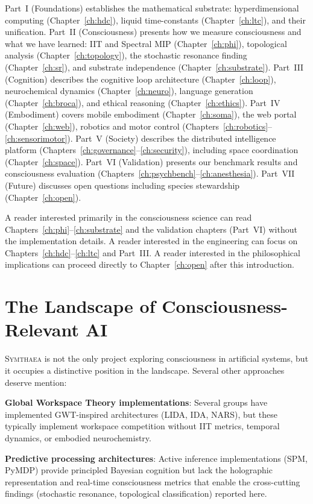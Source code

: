 \documentclass[12pt]{book}
\newcommand{\symthaea}{\textsc{Symthaea}}
\begin{document}
Part~I (Foundations) establishes the mathematical substrate: hyperdimensional computing (Chapter~\ref{ch:hdc}), liquid time-constants (Chapter~\ref{ch:ltc}), and their unification. Part~II (Consciousness) presents how we measure consciousness and what we have learned: IIT and Spectral MIP (Chapter~\ref{ch:phi}), topological analysis (Chapter~\ref{ch:topology}), the stochastic resonance finding (Chapter~\ref{ch:sr}), and substrate independence (Chapter~\ref{ch:substrate}). Part~III (Cognition) describes the cognitive loop architecture (Chapter~\ref{ch:loop}), neurochemical dynamics (Chapter~\ref{ch:neuro}), language generation (Chapter~\ref{ch:broca}), and ethical reasoning (Chapter~\ref{ch:ethics}). Part~IV (Embodiment) covers mobile embodiment (Chapter~\ref{ch:soma}), the web portal (Chapter~\ref{ch:web}), robotics and motor control (Chapters~\ref{ch:robotics}--\ref{ch:sensorimotor}). Part~V (Society) describes the distributed intelligence platform (Chapters~\ref{ch:governance}--\ref{ch:security}), including space coordination (Chapter~\ref{ch:space}). Part~VI (Validation) presents our benchmark results and consciousness evaluation (Chapters~\ref{ch:psychbench}--\ref{ch:anesthesia}). Part~VII (Future) discusses open questions including species stewardship (Chapter~\ref{ch:open}).

A reader interested primarily in the consciousness science can read Chapters~\ref{ch:phi}--\ref{ch:substrate} and the validation chapters (Part~VI) without the implementation details. A reader interested in the engineering can focus on Chapters~\ref{ch:hdc}--\ref{ch:ltc} and Part~III. A reader interested in the philosophical implications can proceed directly to Chapter~\ref{ch:open} after this introduction.

\section{The Landscape of Consciousness-Relevant AI}

\symthaea{} is not the only project exploring consciousness in artificial systems, but it occupies a distinctive position in the landscape. Several other approaches deserve mention:

\textbf{Global Workspace Theory implementations}: Several groups have implemented GWT-inspired architectures (LIDA, IDA, NARS), but these typically implement workspace competition without IIT metrics, temporal dynamics, or embodied neurochemistry.

\textbf{Predictive processing architectures}: Active inference implementations (SPM, PyMDP) provide principled Bayesian cognition but lack the holographic representation and real-time consciousness metrics that enable the cross-cutting findings (stochastic resonance, topological classification) reported here.
\end{document}
